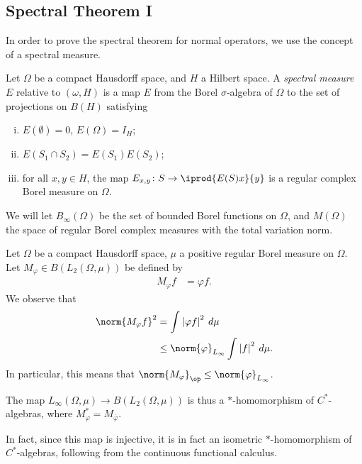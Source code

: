 \documentclass[10pt]{mypackage}
\begin{document}
\subsection{Spectral Theorem I}%
In order to prove the spectral theorem for normal operators, we use the concept of a spectral measure.
\begin{definition}
  Let $\Omega$ be a compact Hausdorff space, and $H$ a Hilbert space. A \textit{spectral measure} $E$ relative to $\left( \omega,H \right)$ is a map $E$ from the Borel $\sigma$-algebra of $\Omega$ to the set of projections on $B(H)$ satisfying
  \begin{enumerate}[(i)]
    \item $E(\emptyset) = 0$, $E(\Omega) = I_H$;
    \item $E\left(S_1\cap S_2\right) = E\left( S_1 \right)E\left( S_2 \right)$;
    \item for all $x,y\in H$, the map $E_{x,y}\colon S\rightarrow \iprod{E(S)x}{y}$ is a regular complex Borel measure on $\Omega$.
  \end{enumerate}
\end{definition}
We will let $B_{\infty}(\Omega)$ be the set of bounded Borel functions on $\Omega$, and $M(\Omega)$ the space of regular Borel complex measures with the total variation norm.
\begin{example}
  Let $\Omega$ be a compact Hausdorff space, $\mu$ a positive regular Borel measure on $\Omega$. Let $M_{\varphi}\in B\left( L_2\left( \Omega,\mu \right) \right)$ be defined by
  \begin{align*}
    M_{\varphi}f &= \varphi f.
  \end{align*}
  We observe that
  \begin{align*}
    \norm{M_{\varphi}f}^2 &= \int_{}^{} \left\vert \varphi f \right\vert^2\:d\mu\\
                          &\leq \norm{\varphi}_{L_{\infty}} \int_{}^{} \left\vert f \right\vert^2\:d\mu.
  \end{align*}
  In particular, this means that $\norm{M_{\varphi}}_{\op}\leq \norm{\varphi}_{L_{\infty}}$.

  The map $L_{\infty}\left( \Omega,\mu \right)\rightarrow B\left( L_2\left( \Omega,\mu \right) \right)$ is thus a $\ast$-homomorphism of $C^{\ast}$-algebras, where $M_{\varphi}^{\ast} = M_{ \overline{\varphi} }$.

  In fact, since this map is injective, it is in fact an isometric $\ast$-homomorphism of $C^{\ast}$-algebras, following from the continuous functional calculus.
\end{example}
\end{document}
